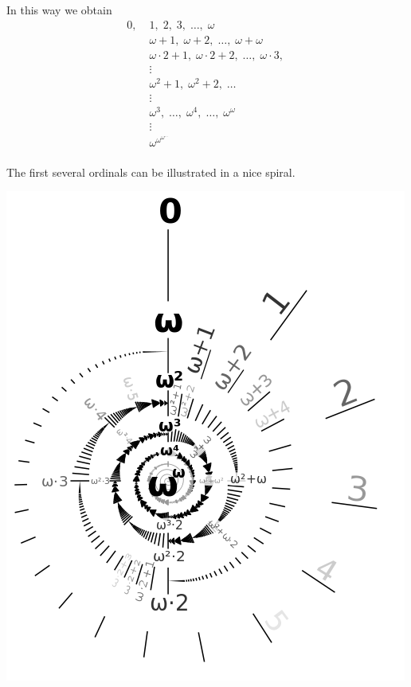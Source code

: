 In this way we obtain
\begin{align*}
	0,\; & 1,\; 2,\; 3,\; \dots,\; \omega \\
	& \omega+1,\; \omega+2,\; \dots,\; \omega+\omega \\
	& \omega \cdot 2 +1,\; \omega \cdot 2 +2,\; \dots,\; \omega \cdot 3,\; \\
	& \vdots \\
	& \omega^2 + 1,\; \omega^2+2,\; \dots \\
	& \vdots \\
	& \omega^3,\; \dots,\; \omega^4,\; \dots,\; \omega^\omega \\
	& \vdots \\
	& \omega^{\omega^{\omega^{\dots}}} \\
\end{align*}

The first several ordinals can be illustrated in a nice spiral.
\begin{center}
	\includegraphics[scale=0.60]{media/500px-Omega-exp-omega-labeled.png}
\end{center}


